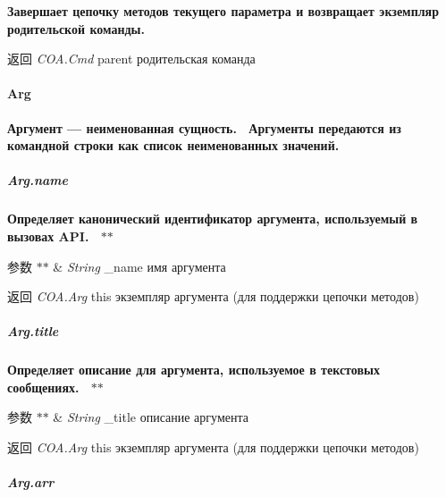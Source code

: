 {\bfseries {\bfseries {\bfseries {\bfseries {\bfseries {\bfseries  Завершает цепочку методов текущего параметра и возвращает экземпляр родительской команды.~\newline
 {\bfseries \begin{DoxyReturn}{返回}
{\itshape C\+O\+A.\+Cmd} {\ttfamily parent} родительская команда
\end{DoxyReturn}
\paragraph*{Arg}}}}}}}}

{\bfseries {\bfseries {\bfseries {\bfseries {\bfseries {\bfseries {\bfseries  Аргумент — неименованная сущность.~\newline
 Аргументы передаются из командной строки как список неименованных значений.}}}}}}}

{\bfseries {\bfseries {\bfseries {\bfseries {\bfseries {\bfseries {\bfseries \subparagraph*{Arg.\+name}}}}}}}}

{\bfseries {\bfseries {\bfseries {\bfseries {\bfseries {\bfseries {\bfseries  Определяет канонический идентификатор аргумента, используемый в вызовах A\+PI.~\newline
 $\ast$$\ast$
\begin{DoxyParams}{参数}
{\em $\ast$$\ast$} & {\itshape String} {\ttfamily \+\_\+name} имя аргумента~\newline
 {\bfseries }\\
\hline
\end{DoxyParams}
\begin{DoxyReturn}{返回}
{\bfseries } {\itshape C\+O\+A.\+Arg} {\ttfamily this} экземпляр аргумента (для поддержки цепочки методов)
\end{DoxyReturn}
\subparagraph*{Arg.\+title}}}}}}}}

{\bfseries {\bfseries {\bfseries {\bfseries {\bfseries {\bfseries {\bfseries  Определяет описание для аргумента, используемое в текстовых сообщениях.~\newline
 $\ast$$\ast$
\begin{DoxyParams}{参数}
{\em $\ast$$\ast$} & {\itshape String} {\ttfamily \+\_\+title} описание аргумента~\newline
 {\bfseries }\\
\hline
\end{DoxyParams}
\begin{DoxyReturn}{返回}
{\bfseries } {\itshape C\+O\+A.\+Arg} {\ttfamily this} экземпляр аргумента (для поддержки цепочки методов)
\end{DoxyReturn}
\subparagraph*{Arg.\+arr}}}}}}}}


